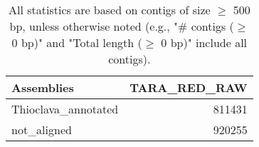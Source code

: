 \documentclass[12pt,a4paper]{article}
\begin{document}
\begin{table}[ht]
\begin{center}
\caption{All statistics are based on contigs of size $\geq$ 500 bp, unless otherwise noted (e.g., "\# contigs ($\geq$ 0 bp)" and "Total length ($\geq$ 0 bp)" include all contigs).}
\begin{tabular}{|l*{1}{|r}|}
\hline
Assemblies & TARA\_RED\_RAW \\ \hline
Thioclava\_annotated & 811431 \\ \hline
not\_aligned & 920255 \\ \hline
\end{tabular}
\end{center}
\end{table}
\end{document}
